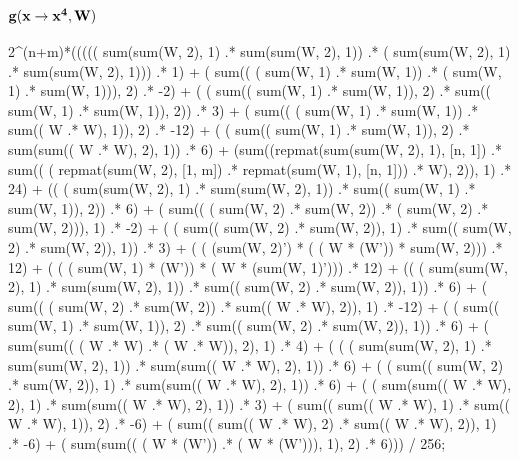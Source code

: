 \documentclass[]{article}
\begin{document}
\subsection{{$\bf g(x \rightarrow x^4, W)$}}
             2\^{}(n+m)*((((( sum(sum(W, 2), 1) .* sum(sum(W, 2), 1))  .* ( sum(sum(W, 2), 1) .* sum(sum(W, 2), 1)))  .* 1)  
              + ( sum(( ( sum(W, 1) .* sum(W, 1)) .* ( sum(W, 1) .* sum(W, 1))), 2) .* -2)  
              + ( ( sum(( sum(W, 1) .* sum(W, 1)), 2) .* sum(( sum(W, 1) .* sum(W, 1)), 2)) .* 3)  
              + ( sum(( ( sum(W, 1) .* sum(W, 1)) .* sum(( W .* W), 1)), 2) .* -12)  
              + ( ( sum(( sum(W, 1) .* sum(W, 1)), 2) .* sum(sum(( W .* W), 2), 1)) .* 6)  
              + (sum((repmat(sum(sum(W, 2), 1), [n, 1])  .* sum(( ( repmat(sum(W, 2), [1, m]) .* repmat(sum(W, 1), [n, 1])) .* W), 2)), 1)  .* 24)  
              + (( ( sum(sum(W, 2), 1) .* sum(sum(W, 2), 1)) .* sum(( sum(W, 1) .* sum(W, 1)), 2))  .* 6)  
              + ( sum(( ( sum(W, 2) .* sum(W, 2)) .* ( sum(W, 2) .* sum(W, 2))), 1) .* -2)  
              + ( ( sum(( sum(W, 2) .* sum(W, 2)), 1) .* sum(( sum(W, 2) .* sum(W, 2)), 1)) .* 3)  
              + ( ( (sum(W, 2)') * ( ( W * (W')) * sum(W, 2))) .* 12)  
              + ( ( ( sum(W, 1) * (W')) * ( W * (sum(W, 1)'))) .* 12)  
              + (( ( sum(sum(W, 2), 1) .* sum(sum(W, 2), 1)) .* sum(( sum(W, 2) .* sum(W, 2)), 1))  .* 6)  
              + ( sum(( ( sum(W, 2) .* sum(W, 2)) .* sum(( W .* W), 2)), 1) .* -12)  
              + ( ( sum(( sum(W, 1) .* sum(W, 1)), 2) .* sum(( sum(W, 2) .* sum(W, 2)), 1)) .* 6)  
              + ( sum(sum(( ( W .* W) .* ( W .* W)), 2), 1) .* 4)  
              + ( ( ( sum(sum(W, 2), 1) .* sum(sum(W, 2), 1)) .* sum(sum(( W .* W), 2), 1)) .* 6)  
              + ( ( sum(( sum(W, 2) .* sum(W, 2)), 1) .* sum(sum(( W .* W), 2), 1)) .* 6)  
              + ( ( sum(sum(( W .* W), 2), 1) .* sum(sum(( W .* W), 2), 1)) .* 3)  
              + ( sum(( sum(( W .* W), 1) .* sum(( W .* W), 1)), 2) .* -6)  
              + ( sum(( sum(( W .* W), 2) .* sum(( W .* W), 2)), 1) .* -6)   
              + ( sum(sum(( ( W * (W')) .* ( W * (W'))), 1), 2) .* 6))) / 256;
\end{document}
